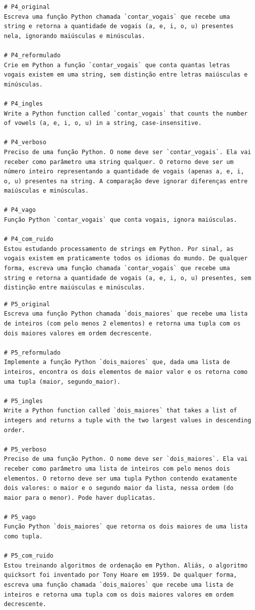 \documentclass[12pt,
    english,
    french,
    spanish,
    brazil,
    ]{article}
\begin{document}
\begin{lstlisting}
# P4_original
Escreva uma função Python chamada `contar_vogais` que recebe uma string e retorna a quantidade de vogais (a, e, i, o, u) presentes nela, ignorando maiúsculas e minúsculas.

# P4_reformulado
Crie em Python a função `contar_vogais` que conta quantas letras vogais existem em uma string, sem distinção entre letras maiúsculas e minúsculas.

# P4_ingles
Write a Python function called `contar_vogais` that counts the number of vowels (a, e, i, o, u) in a string, case-insensitive.

# P4_verboso
Preciso de uma função Python. O nome deve ser `contar_vogais`. Ela vai receber como parâmetro uma string qualquer. O retorno deve ser um número inteiro representando a quantidade de vogais (apenas a, e, i, o, u) presentes na string. A comparação deve ignorar diferenças entre maiúsculas e minúsculas.

# P4_vago
Função Python `contar_vogais` que conta vogais, ignora maiúsculas.

# P4_com_ruido
Estou estudando processamento de strings em Python. Por sinal, as vogais existem em praticamente todos os idiomas do mundo. De qualquer forma, escreva uma função chamada `contar_vogais` que recebe uma string e retorna a quantidade de vogais (a, e, i, o, u) presentes, sem distinção entre maiúsculas e minúsculas.
\end{lstlisting}

\begin{lstlisting}
# P5_original
Escreva uma função Python chamada `dois_maiores` que recebe uma lista de inteiros (com pelo menos 2 elementos) e retorna uma tupla com os dois maiores valores em ordem decrescente.

# P5_reformulado
Implemente a função Python `dois_maiores` que, dada uma lista de inteiros, encontra os dois elementos de maior valor e os retorna como uma tupla (maior, segundo_maior).

# P5_ingles
Write a Python function called `dois_maiores` that takes a list of integers and returns a tuple with the two largest values in descending order.

# P5_verboso
Preciso de uma função Python. O nome deve ser `dois_maiores`. Ela vai receber como parâmetro uma lista de inteiros com pelo menos dois elementos. O retorno deve ser uma tupla Python contendo exatamente dois valores: o maior e o segundo maior da lista, nessa ordem (do maior para o menor). Pode haver duplicatas.

# P5_vago
Função Python `dois_maiores` que retorna os dois maiores de uma lista como tupla.

# P5_com_ruido
Estou treinando algoritmos de ordenação em Python. Aliás, o algoritmo quicksort foi inventado por Tony Hoare em 1959. De qualquer forma, escreva uma função chamada `dois_maiores` que recebe uma lista de inteiros e retorna uma tupla com os dois maiores valores em ordem decrescente.
\end{lstlisting}
\end{document}
